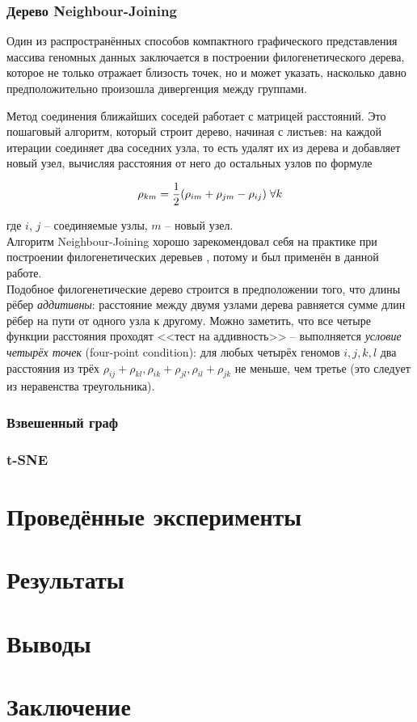 \documentclass[main.tex]{subfiles}
\begin{document}
\subsubsection{Дерево Neighbour-Joining}

Один из распространённых способов компактного графического представления массива геномных данных заключается в построении филогенетического дерева, которое не только отражает близость точек, но и может указать, насколько давно предположительно произошла дивергенция между группами.

Метод соединения ближайших соседей работает с матрицей расстояний. Это пошаговый алгоритм, который строит дерево, начиная с листьев: на каждой итерации соединяет два соседних узла, то есть удалят их из дерева и добавляет новый узел, вычисляя расстояния от него до остальных узлов по формуле

$$ \rho_{km} = \frac{1}{2} (\rho_{im} + \rho_{jm} - \rho_{ij}) \thickspace \forall k $$

где $i$, $j$ -- соединяемые узлы, $m$ -- новый узел.\\

Алгоритм Neighbour-Joining хорошо зарекомендовал себя на практике при построении филогенетических деревьев \cite{durbin}, потому и был применён в данной работе. \\

Подобное филогенетические дерево строится в предположении того, что длины рёбер \textit{аддитивны}: расстояние между двумя узлами дерева равняется сумме длин рёбер на пути от одного узла к другому. Можно заметить, что все четыре функции расстояния проходят <<тест на аддивность>> -- выполняется \textit{условие четырёх точек} (four-point condition): для любых четырёх геномов $ i, j, k, l $ два расстояния из трёх $ \rho_{ij} + \rho_{kl}, \rho_{ik} + \rho_{jl}, \rho_{il} + \rho_{jk} $ не меньше, чем третье (это следует из неравенства треугольника).

\subsubsection{Взвешенный граф}


\subsubsection{t-SNE}



\section{Проведённые эксперименты}\label{experiments}

\section{Результаты}

\section{Выводы}

\section{Заключение} %
\end{document}

